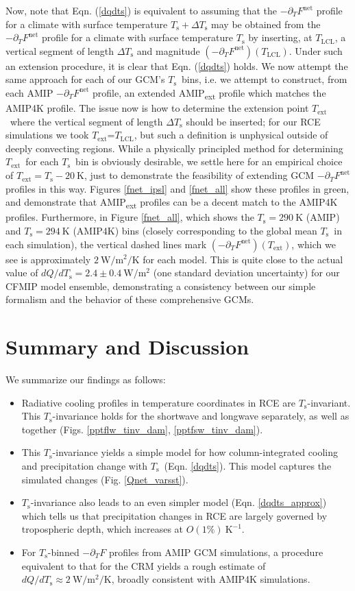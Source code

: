\documentclass[9pt,twocolumn,twoside,lineno]{pnas-new}
\newcommand{\eqnref}[1]{(\ref{#1})}
\newcommand{\ppt}{\ensuremath{\partial_T}}
\newcommand{\Fnet}{\ensuremath{F^\mathrm{net}}}
\newcommand{\Wmsq}{\ensuremath{\mathrm{W/m^2}}}
\newcommand{\WmsqK}{\ensuremath{\mathrm{W/m^2/K}}}
\newcommand{\Kinverse}{\ensuremath{\mathrm{K^{-1}}}}
\newcommand{\Kelvin}{\ensuremath{\mathrm{K}}}
\newcommand{\Ts}{\ensuremath{T_\mathrm{s}}}
\newcommand{\Tlcl}{\ensuremath{T_\mathrm{LCL}}}
\newcommand{\Text}{\ensuremath{T_\mathrm{ext}}}
\begin{document}
Now, note that Eqn. \eqnref{dqdts} is equivalent to assuming that the $-\ppt \Fnet$ profile for  a climate with surface temperature $\Ts + \Delta \Ts$ may be obtained from the $-\ppt \Fnet$ profile for  a climate with surface temperature $\Ts$  by inserting, at \Tlcl, a vertical segment of length $\Delta \Ts$ and magnitude $(-\ppt \Fnet)(\Tlcl)$. Under such an extension procedure, it is clear that Eqn. \eqnref{dqdts} holds. We now attempt the same approach for each of our GCM's \Ts\ bins, i.e. we attempt to construct, from each AMIP $-\ppt \Fnet$ profile, an extended AMIP\textsubscript{ext} profile which matches the AMIP4K profile. The issue now is how to determine the extension point \Text\  where the vertical segment of length $\Delta \Ts$ should be inserted; for our RCE simulations we took \Text =\Tlcl, but such a definition is unphysical outside of deeply convecting regions. While a physically principled method  for determining \Text\ for each  \Ts\ bin is obviously desirable, we settle here for an empirical choice of $\Text = \Ts - 20\ \Kelvin$, just to demonstrate the feasibility of extending GCM $-\ppt\Fnet$ profiles in this way. Figures \ref{fnet_ipsl} and \ref{fnet_all} show these profiles in green, and demonstrate that AMIP\textsubscript{ext} profiles can be a decent match to the AMIP4K profiles. Furthermore, in Figure \ref{fnet_all}, which shows the $\Ts=290\ \Kelvin$ (AMIP) and $\Ts=294 \ \Kelvin$ (AMIP4K) bins (closely corresponding to the global mean \Ts\ in each simulation), the vertical dashed lines mark $(-\ppt\Fnet)(\Text)$, which we see is approximately $2 \ \WmsqK$ for each model. This is quite close to the actual value of $dQ/d\Ts = 2.4 \pm 0.4\ \Wmsq$ (one standard deviation uncertainty) for our CFMIP model ensemble, demonstrating a consistency between our simple formalism and the behavior of these comprehensive GCMs.



\section{Summary and Discussion}
\label{sec_summary}
We summarize our findings as follows:
	\begin{itemize}
		\item Radiative cooling profiles in temperature coordinates in RCE are  \Ts-invariant. This \Ts-invariance holds for the shortwave and longwave separately, as well as together (Figs. \ref{pptflw_tinv_dam}, \ref{pptfsw_tinv_dam}).
		\item This \Ts-invariance yields a simple model for how column-integrated cooling and  precipitation change with \Ts\ (Eqn. \ref{dqdts}). This model captures the simulated changes (Fig. \ref{Qnet_varsst}).
		\item \Ts-invariance also leads to an even simpler model (Eqn. \ref{dqdts_approx}) which tells us that precipitation changes in RCE are largely governed by tropospheric depth, which increases at $O(1\%)\ \Kinverse$.
		\item For \Ts-binned $-\ppt F$ profiles from AMIP GCM simulations, a procedure equivalent to that for the CRM yields a rough estimate of $dQ/d\Ts \approx 2\ \WmsqK$, broadly consistent with  AMIP4K simulations.
	\end{itemize}
		
\end{document}
